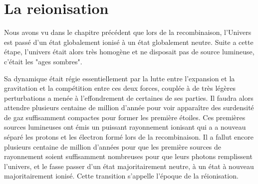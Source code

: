 \chapter{La reionisation} 
\label{sec:introreio}
%
%
%
%

Nous avons vu dans le chapitre précédent que lors de la recombinaison, l'Univers est passé d'un état globalement ionisé à un état globalement neutre.
Suite a cette étape, l'univers était alors très homogène et ne disposait pas de source lumineuse, c'était les "ages sombres".


Sa dynamique était régie essentiellement par la lutte entre l'expansion et la gravitation et la compétition entre ces deux forces, couplée à de très légères perturbations a menée à l'effondrement de certaines de ses parties.
Il faudra alors attendre plusieurs centaine de million d'année pour voir apparaître des surdensité de gaz suffisamment compactes pour former les première étoiles.
Ces premières sources lumineuses ont émis un puissant rayonnement ionisant qui a a nouveau séparé les protons et les électron formé lors de la recombinaison.
Il a fallut encore plusieurs centaine de million d'années pour que les première sources de rayonnement soient suffisamment nombreuses pour que leurs photons remplissent l'univers, et le fasse passer d'un état majoritairement neutre, à un état à nouveau majoritairement ionisé. 
Cette transition s'appelle l’époque de la réionisation.


